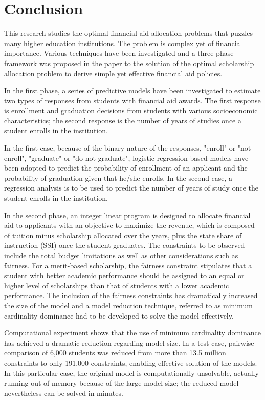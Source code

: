 \documentclass[12pt,english]{report}
\begin{document}

\chapter{Conclusion}
This research studies the optimal financial aid allocation problems that puzzles many higher education institutions.  The problem is complex yet of financial importance. Various techniques have been investigated and a three-phase framework was proposed in the paper to the solution of the optimal scholarship allocation problem to derive simple yet effective financial aid policies.

In the first phase, a series of predictive models have been investigated to estimate two types of responses from students with financial aid awards. The first response is enrollment and graduation decisions from students with various socioeconomic characteristics;  the second response is the number of years of studies once a student enrolls in the institution.

In the first case,  because of the binary nature of the responses,  "enroll" or "not enroll",  "graduate" or "do not graduate", logistic regression based models have been adopted to predict the probability of enrollment of an applicant and the probability of graduation given that he/she enrolls. In the second case, a regression analysis is to be used to predict the number of years of study once the student enrolls in the institution.

In the second phase, an integer linear program is designed to allocate financial aid to applicants with an objective to maximize the revenue, which is composed of tuition minus scholarship allocated over the years, plus the state share of instruction (SSI) once the student graduates.  The constraints to be observed include the total budget limitations as well as other considerations such as fairness. For a merit-based scholarship, the fairness constraint stipulates that a student with better academic performance should be assigned to an equal or higher level of scholarships than that of students with a lower academic performance. The inclusion of the fairness constraints has dramatically increased the size of the model and a model reduction technique, referred to as minimum cardinality dominance had to be developed to solve the model effectively.

Computational experiment shows that the use of minimum cardinality dominance has achieved a dramatic reduction regarding model size. In a test case, pairwise comparison of 6,000 students was reduced from more than 13.5 million constraints to only 191,000 constraints, enabling effective solution of the models.  In this particular case,  the original model is computationally unsolvable, actually running out of memory because of the large model size;  the reduced model nevertheless can be solved in minutes.
\end{document}
